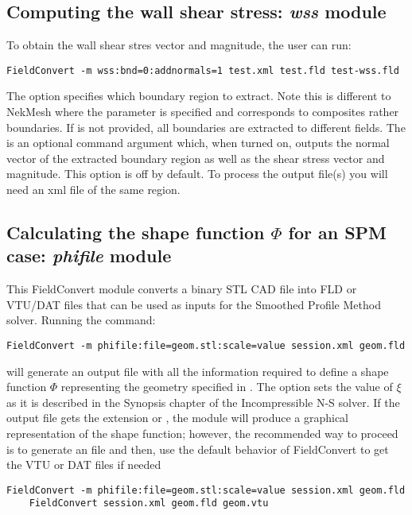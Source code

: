 \subsection{Computing the wall shear stress: \textit{wss} module}
To obtain the wall shear stres vector and magnitude, the user can run:
\begin{lstlisting}[style=BashInputStyle]
FieldConvert -m wss:bnd=0:addnormals=1 test.xml test.fld test-wss.fld
\end{lstlisting}
The option  specifies which boundary region to extract. Note this is
different to NekMesh where the parameter  is specified and corresponds
to composites rather boundaries. If  is not provided, all boundaries
are extracted to different fields. The  is an optional command
argument which, when turned on, outputs the normal vector of the extracted boundary
region as well as the shear stress vector and magnitude. This option is off by default.
To process the output file(s) you will need an xml file of the same region.
%
%
%

\subsection{Calculating the shape function $\Phi$ for an SPM case:
\textit{phifile} module}

This FieldConvert module converts a binary STL CAD file into FLD or VTU/DAT
files that can be used as inputs for the Smoothed Profile Method solver.
Running the command:

\begin{lstlisting}[style=BashInputStyle]
    FieldConvert -m phifile:file=geom.stl:scale=value session.xml geom.fld
\end{lstlisting}

will generate an output file  with all the information required
to define a shape function $\Phi$ representing the geometry specified in
. The option  sets the value of $\xi$ as it is
described in the Synopsis chapter of the Incompressible N-S solver. If the
output file gets the extension  or , the module will
produce a graphical representation of the shape function; however, the
recommended way to proceed is to generate an  file and then, use
the default behavior of FieldConvert to get the VTU or DAT files if needed

\begin{lstlisting}[style=BashInputStyle]
    FieldConvert -m phifile:file=geom.stl:scale=value session.xml geom.fld
    FieldConvert session.xml geom.fld geom.vtu
\end{lstlisting}

